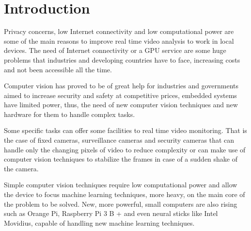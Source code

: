 \documentclass[fleqn,12pt]{SelfArx} %
\affiliation{\textsuperscript{1}\textit{Chief Technology Officer, DeMS, Smart Cities}} %
\affiliation{\textsuperscript{2}\textit{Chief Executive Officer, DeMS, Smart Cities}} %
\affiliation{*\textbf{Stanley Salvatierra}: s.salvatierra@deepmicrosystems.com} %
\begin{document}
\flushbottom %

\maketitle %

\tableofcontents %

\thispagestyle{empty} %


\section*{Introduction} %


Privacy concerns, low Internet connectivity and low computational power are some of the main reasons to improve real time video analysis to work in local devices. The need of Internet connectivity or a GPU service are some huge problems that industries and developing countries have to face, increasing costs and not been accessible all the time.

Computer vision has proved to be of great help for industries and governments aimed to increase security and safety at competitive prices, embedded systems have limited power, thus, the need of new computer vision techniques and new hardware for them to handle complex tasks.

Some specific tasks can offer some facilities to real time video monitoring. That is the case of fixed cameras, surveillance cameras and security cameras that can handle only the changing pixels of video to reduce complexity or can make use of computer vision techniques to stabilize the frames in case of a sudden shake of the camera.

Simple computer vision techniques require low computational power and allow the device to focus machine learning techniques, more heavy, on the main core of the problem to be solved. New, more powerful, small computers are also rising such as Orange Pi, Raspberry Pi 3 B + and even neural sticks like Intel Movidius, capable of handling new machine learning techniques.
\end{document}
